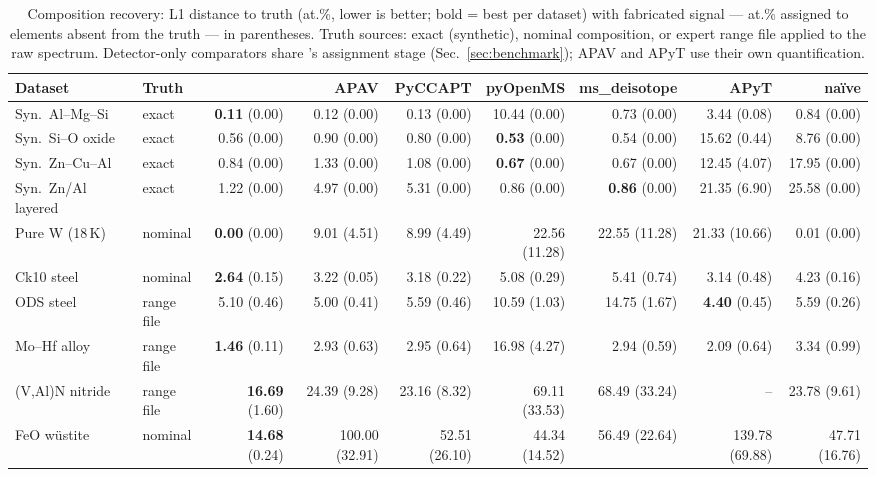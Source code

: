 \begin{table}[t]
\centering
\caption{Composition recovery: L1 distance to truth (at.\%, lower is
better; bold = best per dataset) with fabricated signal --- at.\%
assigned to elements absent from the truth --- in parentheses.
Truth sources: exact (synthetic), nominal composition, or expert
range file applied to the raw spectrum. Detector-only comparators
share \rf{}'s assignment stage (Sec.~\ref{sec:benchmark}); APAV and
APyT use their own quantification.}
\label{tab:composition}
\small
\begin{adjustbox}{max width=\textwidth}
\begin{tabular}{llrrrrrrr}
\toprule
Dataset & Truth & \rf{} & APAV & PyCCAPT & pyOpenMS & ms\_deisotope & APyT & na\"ive \\
\midrule
Syn.\ Al--Mg--Si & exact & \textbf{0.11} (0.00) & 0.12 (0.00) & 0.13 (0.00) & 10.44 (0.00) & 0.73 (0.00) & 3.44 (0.08) & 0.84 (0.00) \\
Syn.\ Si--O oxide & exact & 0.56 (0.00) & 0.90 (0.00) & 0.80 (0.00) & \textbf{0.53} (0.00) & 0.54 (0.00) & 15.62 (0.44) & 8.76 (0.00) \\
Syn.\ Zn--Cu--Al & exact & 0.84 (0.00) & 1.33 (0.00) & 1.08 (0.00) & \textbf{0.67} (0.00) & 0.67 (0.00) & 12.45 (4.07) & 17.95 (0.00) \\
Syn.\ Zn/Al layered & exact & 1.22 (0.00) & 4.97 (0.00) & 5.31 (0.00) & 0.86 (0.00) & \textbf{0.86} (0.00) & 21.35 (6.90) & 25.58 (0.00) \\
Pure W (18\,K) & nominal & \textbf{0.00} (0.00) & 9.01 (4.51) & 8.99 (4.49) & 22.56 (11.28) & 22.55 (11.28) & 21.33 (10.66) & 0.01 (0.00) \\
Ck10 steel & nominal & \textbf{2.64} (0.15) & 3.22 (0.05) & 3.18 (0.22) & 5.08 (0.29) & 5.41 (0.74) & 3.14 (0.48) & 4.23 (0.16) \\
ODS steel & range file & 5.10 (0.46) & 5.00 (0.41) & 5.59 (0.46) & 10.59 (1.03) & 14.75 (1.67) & \textbf{4.40} (0.45) & 5.59 (0.26) \\
Mo--Hf alloy & range file & \textbf{1.46} (0.11) & 2.93 (0.63) & 2.95 (0.64) & 16.98 (4.27) & 2.94 (0.59) & 2.09 (0.64) & 3.34 (0.99) \\
(V,Al)N nitride & range file & \textbf{16.69} (1.60) & 24.39 (9.28) & 23.16 (8.32) & 69.11 (33.53) & 68.49 (33.24) & -- & 23.78 (9.61) \\
FeO w\"ustite & nominal & \textbf{14.68} (0.24) & 100.00 (32.91) & 52.51 (26.10) & 44.34 (14.52) & 56.49 (22.64) & 139.78 (69.88) & 47.71 (16.76) \\

\end{tabular}
\end{adjustbox}
\end{table}
